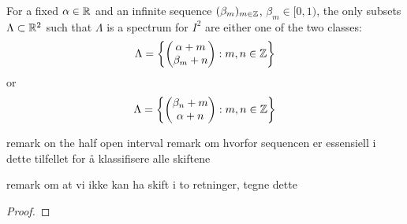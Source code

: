 \documentclass[../thesis.tex]{subfiles}
\begin{document}
\begin{theorem}\label{thrm:class_all_shift_2d}
    For a fixed $\alpha \in \mathbb{R}$ and an infinite sequence $(\beta_m)_{m\in \mathbb{Z}}$, $\beta_m \in [0,1)$, the only subsets $\Lambda \subset \mathbb{R}^2$ such that $\Lambda$ is a spectrum for $I^2$ are either one of the two classes:
    \begin{equation}
        \Lambda = \left\{
            \begin{pmatrix}
            \alpha + m\\
            \beta_m + n
            \end{pmatrix} : m,n \in  \mathbb{Z}
            \right\}
    \end{equation}
    or
    \begin{equation}
        \Lambda = \left\{
            \begin{pmatrix}
            \beta_n + m\\
            \alpha + n
            \end{pmatrix} : m,n \in  \mathbb{Z}
            \right\}
    \end{equation}
\end{theorem}
remark on the half open interval
remark om hvorfor sequencen er essensiell i dette tilfellet for å klassifisere alle skiftene %


remark om at vi ikke kan ha skift i to retninger, tegne dette

\begin{proof}
    
\end{proof}
\end{document}
